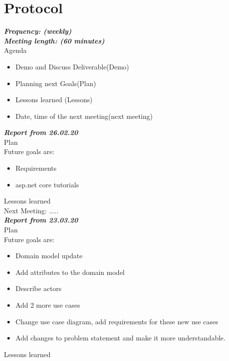 \documentclass{scrartcl}
\begin{document}
                      
        
    


   

   
    
   
  

\section{Protocol}
\textbf{\textit{Frequency: (weekly) \\
Meeting length: (60 minutes)}}\\

Agenda

\begin{itemize}
  	\item Demo and Discuss Deliverable(Demo)
  	\item Planning next Goals(Plan)
  	\item Lessons learned (Lessons)
  	\item Date, time of the next meeting(next meeting)
 \end{itemize} 	


\textbf{\textit{Report from  26.02.20 }}\\
Plan\\
Future goals are: 
\begin{itemize}


	\item Requirements 
	\item asp.net core tutorials 
\end{itemize}	
Lessons learned\\

Next Meeting: .....\\

\textbf{\textit{Report from 23.03.20  }}\\
Plan\\
Future goals are: 
\begin{itemize}

  \item Domain model update
	\item Add attributes to the domain model
	\item Describe actors 
	\item Add 2 more use cases 
	\item Change use case diagram, add requirements for these new use cases
	\item Add changes to problem statement and make it more understandable.
\end{itemize}	
Lessons learned\\
\end{document}
